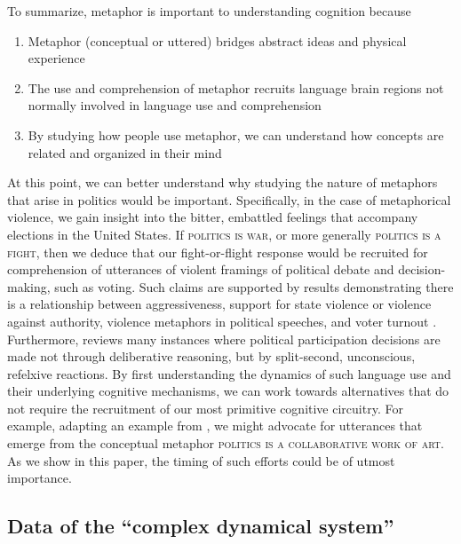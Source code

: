 To summarize, metaphor is important to understanding cognition because 
\begin{enumerate}
    \item Metaphor (conceptual or uttered) bridges abstract ideas and physical experience \cite{Jamrozik2015}
  \item The use and comprehension of metaphor recruits language brain regions not normally 
    involved in language use and comprehension
  \item By studying how people use metaphor, we can understand how concepts
    are related and organized in their mind
\end{enumerate}
At this point, we can better understand why studying the nature of metaphors
that arise in politics would be important. Specifically, in the case of
metaphorical violence, we gain insight into the bitter, embattled feelings
that accompany elections in the United States. If \textsc{politics is war},
or more generally \textsc{politics is a fight}, then we deduce that our
fight-or-flight response would be recruited for comprehension of utterances
of violent framings of political debate and decision-making, such as voting.
Such claims are supported by results demonstrating there is a relationship
between aggressiveness, support for state violence or violence against authority, 
violence metaphors in political speeches, and voter turnout \cite{Kalmoe2012}.
Furthermore,  reviews many instances where political
participation decisions are made not through deliberative reasoning, but by
split-second, unconscious, refelxive reactions.
By first understanding the dynamics of such language use and their underlying
cognitive mechanisms, we can work towards
alternatives that do not require the recruitment of our most primitive 
cognitive circuitry. 
For example, adapting an example from , we might
advocate for utterances that emerge from the conceptual metaphor
\textsc{politics is a collaborative work of art}. As we show in this paper,
the timing of such efforts could be of utmost importance.


\subsection{Data of the ``complex dynamical system''}

